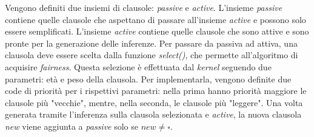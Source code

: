 Vengono definiti due insiemi di clausole: \emph{passive} e \emph{active}.
L'insieme \emph{passive} contiene quelle clausole che aspettano di passare all'insieme \emph{active} e possono solo essere 
semplificati. L'insieme \emph{active} contiene quelle clausole che sono attive e sono pronte per 
la generazione delle inferenze. Per passare da passiva ad attiva, una clausola deve essere scelta dalla funzione \emph{select()}, 
che permette all'algoritmo di acquisire \emph{fairness}. Questa selezione è effettuata 
dal \emph{kernel} seguendo due parametri: età e peso della clausola. Per implementarla, vengono definite due code di priorità per i rispettivi parametri:
nella prima hanno priorità maggiore le clausole più "vecchie", mentre, nella seconda, le clausole più "leggere". 
Una volta generata tramite l'inferenza sulla clausola selezionata e \emph{active}, la nuova clausola \emph{new} viene aggiunta a \emph{passive} solo se $new\neq\square$.
